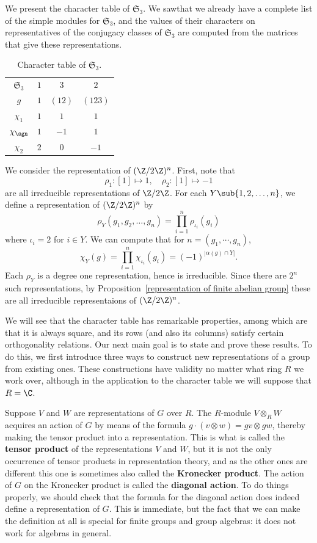 \begin{example}
We present the character table of $\mathfrak{S}_3$. We sawthat we already have a complete list of the simple modules for $\mathfrak{S}_3$, and the values of their characters on representatives of the conjugacy classes of $\mathfrak{S}_3$ are computed from the matrices that give these representations.
\begin{table}[h]
\centering
\begin{tabular}{c|ccc}
\toprule
$\mathfrak{S}_3$&$1$&$3$&$2$\\
$g$&$1$&$(12)$&$(123)$\\
\midrule
$\chi_1$&$1$&$1$&$1$\\
$\chi_{\sgn}$&$1$&$-1$&$1$\\
$\chi_2$&$2$&$0$&$-1$\\
\bottomrule
\end{tabular}
\caption{Character table of $\mathfrak{S}_3$.}
\end{table}
\end{example}
\begin{example}
We consider the representation of $(\Z/2\Z)^n$. First, note that
\[\rho_1:[1]\mapsto 1,\quad \rho_2:[1]\mapsto-1\]
are all irreducible representations of $\Z/2\Z$. For each $Y\sub\{1,2,\dots,n\}$, we define a representation of $(\Z/2\Z)^n$ by
\[\rho_Y(g_1,g_2,\dots,g_n)=\prod_{i=1}^{n}\rho_{\iota_i}(g_i)\]
where $\iota_i=2$ for $i\in Y$. We can compute that for $n=(g_1,\cdots,g_n)$,
\[\chi_Y(g)=\prod_{i=1}^{n}\chi_{\iota_i}(g_i)=(-1)^{|\alpha(g)\cap Y|}.\]
Each $\rho_Y$ is a degree one representation, hence is irreducible. Since there are $2^n$ such representations, by Proposition~\ref{representation of finite abelian group} these are all irreducible representaions of $(\Z/2\Z)^n$.
\end{example}
We will see that the character table has remarkable properties, among which
are that it is always square, and its rows (and also its columns) satisfy certain orthogonality relations. Our next main goal is to state and prove these results. To do this, we first introduce three ways to construct new representations of a group from existing ones. These constructions have validity no matter what ring $R$ we work over, although in the application to the character table we will suppose that $R=\C$.\par
Suppose $V$ and $W$ are representations of $G$ over $R$. The $R$-module $V\otimes_RW$ acquires an action of $G$ by means of the formula $g\cdot(v\otimes w)=gv\otimes gw$, thereby making the tensor product into a representation. This is what is called the \textbf{tensor product} of the representations $V$ and $W$, but it is not the only occurrence of tensor products in representation theory, and as the other ones are different this one is sometimes also called the \textbf{Kronecker product}. The action of $G$ on the Kronecker product is called the \textbf{diagonal action}. To do things properly, we should check that the formula for the diagonal action does indeed define a representation of $G$. This is immediate, but the fact that we can make the definition at all is special for finite groups and group algebras: it does not work for algebras in general.\par
